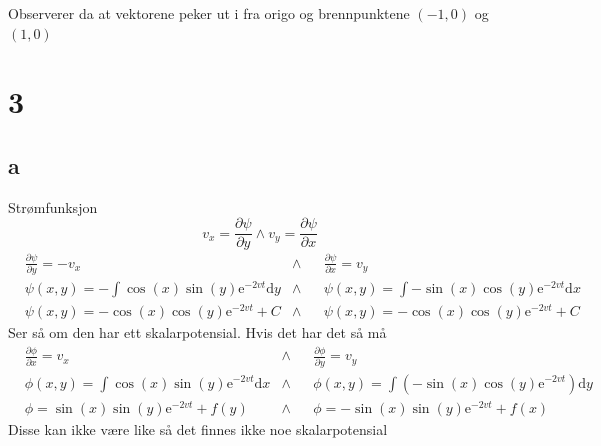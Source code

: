 \documentclass[a4paper,10pt,norsk]{article}
\newcommand{\dd}[1]{\mathrm{d}#1}
\begin{document}
		Observerer da at vektorene peker ut i fra origo og brennpunktene $(-1, 0)$ og $(1,0)$
		\newpage
	

\section*{3}
	\subsection*{a}
		Strømfunksjon \[
		v_x = \frac{\partial \psi}{\partial y}  \wedge v_y = \frac{\partial \psi}{\partial x} 
		\] 
		\begin{align*}
			& \frac{\partial \psi}{\partial y} = -v_x
			& \wedge &
			& \frac{\partial \psi}{\partial x} = v_y\\
			& \psi (x,y) = - \int \cos(x) \sin(y) \mathrm{e} ^{-2vt} \dd{y}
			& \wedge &
			& \psi (x,y) = \int -\sin(x) \cos(y) \mathrm{e}^{-2vt} \dd{x}\\
			& \psi (x,y) = - \cos(x) \cos(y)  \mathrm{e}^{-2vt} + C
			& \wedge &
			& \psi (x,y) = - \cos(x) \cos(y)  \mathrm{e}^{-2vt} + C
		\end{align*}
		Ser så om den har ett skalarpotensial. Hvis det har det så må 
		\begin{align*}
			&\frac{\partial \phi}{\partial x} = v_x 
			&\wedge & 
			&\frac{\partial \phi}{\partial y} = v_y \\
			& \phi(x,y) = \int \cos(x) \sin(y) \mathrm{e}^{-2vt} \dd{x}
			& \wedge &
			& \phi(x,y) = \int \left( -\sin(x) \cos(y) \mathrm{e}^{-2vt} \right) \dd{y}\\
			& \phi = \sin(x) \sin(y) \mathrm{e}^{-2vt} + f(y)
			& \wedge &
			& \phi = - \sin(x) \sin(y) \mathrm{e}^{-2vt} + f(x)
		\end{align*}
		Disse kan ikke være like så det finnes ikke noe skalarpotensial
\end{document}

